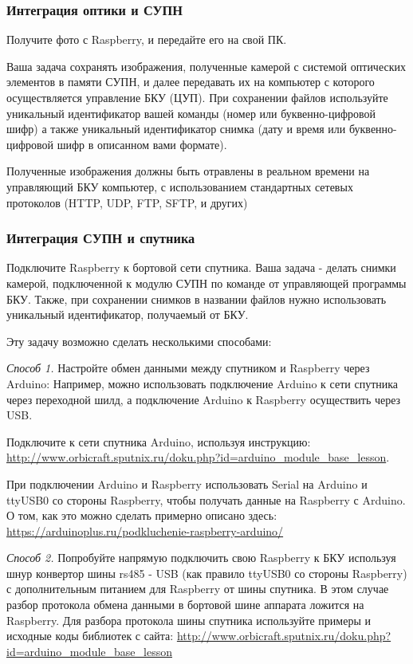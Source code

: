 \subsubsection*{Интеграция оптики и СУПН}

Получите фото с Raspberry, и передайте его на свой ПК.

Ваша задача сохранять изображения, полученные камерой с системой оптических элементов в памяти СУПН, и далее передавать их на компьютер с которого осуществляется управление БКУ (ЦУП). При сохранении файлов используйте уникальный идентификатор вашей команды (номер или буквенно-цифровой шифр) а также уникальный идентификатор снимка (дату и время или буквенно-цифровой шифр в описанном вами формате). 

Полученные изображения должны быть отравлены в реальном времени на управляющий БКУ компьютер, с использованием стандартных сетевых протоколов (HTTP, UDP, FTP, SFTP, и других)

\subsubsection*{Интеграция СУПН и спутника}

Подключите Raspberry к бортовой сети спутника. Ваша задача  - делать снимки камерой, подключенной к модулю СУПН по команде от управляющей программы БКУ. Также, при сохранении снимков в названии файлов нужно использовать уникальный идентификатор, получаемый от БКУ.  

Эту задачу возможно сделать несколькими способами:

\textit{Способ 1.} Настройте обмен данными между спутником и Raspberry через Arduino: 
Например, можно использовать подключение Arduino к сети спутника через переходной шилд, а подключение Arduino к Raspberry осуществить через USB.

Подключите к сети спутника Arduino, используя инструкцию:\\ \url{http://www.orbicraft.sputnix.ru/doku.php?id=arduino_module_base_lesson}.

При подключении Arduino и Raspberry использовать Serial на Arduino и ttyUSB0 со стороны Raspberry, чтобы получать данные на Raspberry с Arduino. О том, как это можно сделать примерно описано здесь: \url{https://arduinoplus.ru/podkluchenie-raspberry-arduino/}

\textit{Способ 2.} Попробуйте напрямую подключить свою Raspberry к БКУ используя шнур конвертор шины rs485 - USB (как правило ttyUSB0 со стороны Raspberry) с дополнительным питанием для Raspberry от шины спутника. В этом случае разбор протокола обмена данными в бортовой шине аппарата ложится на Raspberry. Для разбора протокола шины спутника используйте примеры и исходные коды библиотек с сайта: \url{http://www.orbicraft.sputnix.ru/doku.php?id=arduino_module_base_lesson}

